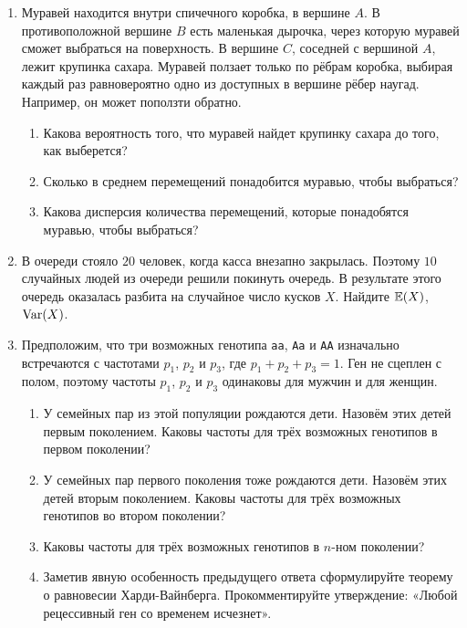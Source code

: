 \documentclass[12pt, a4paper]{article}\usepackage[]{graphicx}\usepackage[]{color}
\begin{document}
				\begin{enumerate}

					\item Муравей находится внутри спичечного коробка, в вершине $A$. В противоположной вершине $B$ есть маленькая дырочка, через которую муравей сможет выбраться на поверхность. В вершине $C$, соседней с вершиной $A$, лежит крупинка сахара. Муравей ползает только по рёбрам коробка, выбирая каждый раз равновероятно одно из доступных в вершине рёбер наугад. Например, он может поползти обратно.
					\begin{enumerate}
						\item Какова вероятность того, что муравей найдет крупинку сахара до того, как выберется?
						\item Сколько в среднем перемещений понадобится муравью, чтобы выбраться?
						\item Какова дисперсия количества перемещений, которые понадобятся муравью, чтобы выбраться?
					\end{enumerate}

					\item В очереди стояло $20$ человек, когда касса внезапно закрылась. Поэтому $10$ случайных людей из очереди решили покинуть очередь. В результате этого очередь оказалась разбита на случайное число кусков $X$. Найдите $\mathbb{E}(X)$, $\operatorname{Var}(X)$.

					\item Предположим, что три возможных генотипа \verb|aa|, \verb|Aa| и \verb|AA| изначально встречаются с частотами $p_1$, $p_2$ и $p_3$, где $p_1+p_2+p_3=1$. Ген не сцеплен с полом, поэтому частоты $p_1$, $p_2$ и $p_3$ одинаковы для мужчин и для женщин.
					\begin{enumerate}
						\item У семейных пар из этой популяции рождаются дети. Назовём этих детей первым поколением. Каковы частоты для трёх возможных генотипов в первом поколении?
						\item У семейных пар первого поколения тоже рождаются дети. Назовём этих детей вторым поколением. Каковы частоты для трёх возможных генотипов во втором поколении?
						\item Каковы частоты для трёх возможных генотипов в $n$-ном поколении?
						\item Заметив явную особенность предыдущего ответа сформулируйте теорему о равновесии Харди-Вайнберга. Прокомментируйте утверждение: «Любой рецессивный ген со временем исчезнет».
					\end{enumerate}


\end{enumerate}
\end{document}
